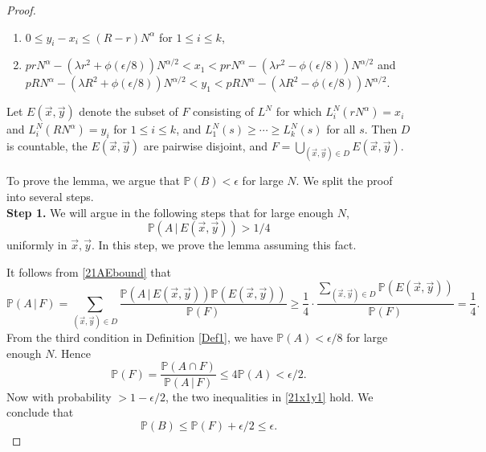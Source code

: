 \begin{proof}
\begin{enumerate}[label=(\arabic*)]
			\item $0\leq y_i - x_i \leq (R-r)N^\alpha$ for $1\leq i\leq k$,
			
			\item $prN^\alpha - (\lambda r^2+\phi(\epsilon/8))N^{\alpha/2} < x_1 <  prN^\alpha - (\lambda r^2-\phi(\epsilon/8))N^{\alpha/2}$ and $pRN^\alpha - (\lambda R^2+\phi(\epsilon/8))N^{\alpha/2} < y_1 <  pRN^\alpha - (\lambda R^2-\phi(\epsilon/8))N^{\alpha/2}$.
			
		\end{enumerate}
		Let $E(\vec{x},\vec{y})$ denote the subset of $F$ consisting of $L^N$ for which $L_i^N(rN^\alpha) = x_i$ and $L_i^N(RN^\alpha)=y_i$ for $1\leq i\leq k$, and $L_1^N(s) \geq \cdots \geq L_k^N(s)$ for all $s$. Then $D$ is countable, the $E(\vec{x},\vec{y})$ are pairwise disjoint, and $F = \bigcup_{(\vec{x},\vec{y})\in D} E(\vec{x},\vec{y})$.
		
		To prove the lemma, we argue that $\mathbb{P}(B) < \epsilon$ for large $N$. We split the proof into several steps.\\
		
		\noindent\textbf{Step 1.} We will argue in the following steps that for large enough $N$,
		\begin{equation}\label{21AEbound}
		\mathbb{P}(A\,|\, E(\vec{x},\vec{y})) > 1/4
		\end{equation}
		uniformly in $\vec{x},\vec{y}$. In this step, we prove the lemma assuming this fact. 
		
		It follows from \eqref{21AEbound} that
		\begin{equation}
		\mathbb{P}(A\,|\,F) = \sum_{(\vec{x},\vec{y})\in D} \frac{\mathbb{P}(A\,|\,E(\vec{x},\vec{y}))\mathbb{P}(E(\vec{x},\vec{y}))}{\mathbb{P}(F)} \geq \frac{1}{4}\cdot\frac{\sum_{(\vec{x},\vec{y})\in D} \mathbb{P}(E(\vec{x},\vec{y}))}{\mathbb{P}(F)} = \frac{1}{4}.
		\end{equation}
		From the third condition in Definition \ref{Def1}, we have $\mathbb{P}(A) < \epsilon/8$ for large enough $N$. Hence
		\[
		\mathbb{P}(F) = \frac{\mathbb{P}(A\cap F)}{\mathbb{P}(A\,|\,F)} \leq 4\mathbb{P}(A) < \epsilon/2.
		\]
		Now with probability $>1-\epsilon/2$, the two inequalities in \eqref{21x1y1} hold. We conclude that
		\[
		\mathbb{P}(B) \leq \mathbb{P}(F) + \epsilon/2 \leq \epsilon.
		\]
		

\end{proof}

